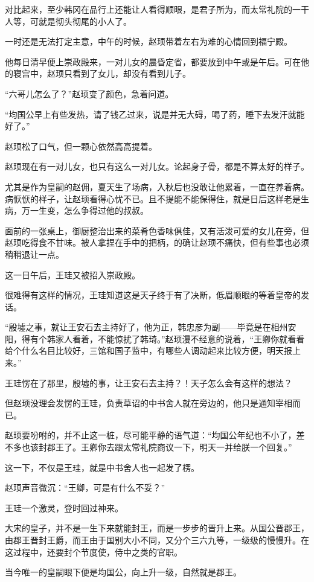 对比起来，至少韩冈在品行上还能让人看得顺眼，是君子所为，而太常礼院的一干人等，可就是彻头彻尾的小人了。

一时还是无法打定主意，中午的时候，赵顼带着左右为难的心情回到福宁殿。

他每日清早便上崇政殿来，一对儿女的晨昏定省，都要放到中午或是午后。可在他的寝宫中，赵顼只看到了女儿，却没有看到儿子。

“六哥儿怎么了？”赵顼变了颜色，急着问道。

“均国公早上有些发热，请了钱乙过来，说是并无大碍，喝了药，睡下去发汗就能好了。”

赵顼松了口气，但一颗心依然高高提着。

赵顼现在有一对儿女，也只有这么一对儿女。论起身子骨，都是不算太好的样子。

尤其是作为皇嗣的赵佣，夏天生了场病，入秋后也没敢让他累着，一直在养着病。病恹恹的样子，让赵顼看得心忧不已。且不提能不能保得住，就是日后这样老是生病，万一生变，怎么争得过他的叔叔。

面前的一张桌上，御厨整治出来的菜肴色香味俱佳，又有活泼可爱的女儿在旁，但赵顼吃得食不甘味。被人拿捏在手中的把柄，的确让赵顼不痛快，但有些事也必须稍稍退让一点。

这一日午后，王珪又被招入崇政殿。

很难得有这样的情况，王珪知道这是天子终于有了决断，低眉顺眼的等着皇帝的发话。

“殷墟之事，就让王安石去主持好了，他为正，韩忠彦为副——毕竟是在相州安阳，得有个韩家人看着，不能惊扰了韩琦。”赵顼漫不经意的说着，“王卿你就看看给个什么名目比较好，三馆和国子监中，有哪些人调动起来比较方便，明天报上来。”

王珪愣在了那里，殷墟的事，让王安石去主持？！天子怎么会有这样的想法？

但赵顼没理会发愣的王珪，负责草诏的中书舍人就在旁边的，他只是通知宰相而已。

赵顼要吩咐的，并不止这一桩，尽可能平静的语气道：“均国公年纪也不小了，差不多也该封郡王了。王卿你去跟太常礼院商议一下，明天一并给朕一个回复。”

这一下，不仅是王珪，就是中书舍人也一起发了楞。

赵顼声音微沉：“王卿，可是有什么不妥？”

王珪一个激灵，登时回过神来。

大宋的皇子，并不是一生下来就能封王，而是一步步的晋升上来。从国公晋郡王，由郡王晋封王爵，而王由于国别大小不同，又分个三六九等，一级级的慢慢升。在这过程中，还要封个节度使，侍中之类的官职。

当今唯一的皇嗣眼下便是均国公，向上升一级，自然就是郡王。

